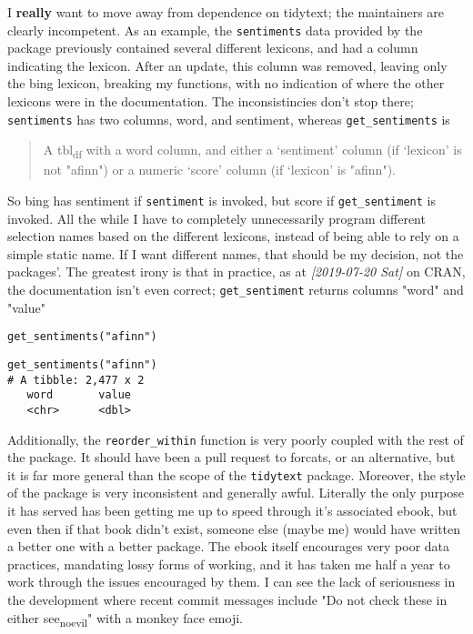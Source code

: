 \documentclass[a4paper, 11pt]{article}
\begin{document}
I \textbf{really} want to move away from dependence on tidytext; the
maintainers are clearly incompetent. As an example, the \texttt{sentiments}
data provided by the package previously contained several different
lexicons, and had a column indicating the lexicon. After an update,
this column was removed, leaving only the bing lexicon, breaking my
functions, with no indication of where the other lexicons were in the
documentation. The inconsistincies don't stop there; \texttt{sentiments} has
two columns, word, and sentiment, whereas \texttt{get\_sentiments} is
\begin{quote}
A tbl\textsubscript{df} with a word column, and either a ‘sentiment’ column (if
‘lexicon’ is not "afinn") or a numeric ‘score’ column (if
‘lexicon’ is "afinn").
\end{quote}
So bing has sentiment if \texttt{sentiment} is invoked, but score if
\texttt{get\_sentiment} is invoked. All the while I have to completely
unnecessarily program different selection names based on the different
lexicons, instead of being able to rely on a simple static name. If I
want different names, that should be my decision, not the packages'.
The greatest irony is that in practice, as at \textit{[2019-07-20 Sat] } on
CRAN, the documentation isn't even correct; \texttt{get\_sentiment} returns
columns "word" and "value"

\begin{verbatim}
get_sentiments("afinn")
\end{verbatim}

\begin{verbatim}
get_sentiments("afinn")
# A tibble: 2,477 x 2
   word       value
   <chr>      <dbl>
\end{verbatim}


 Additionally, the \texttt{reorder\_within} function is very
poorly coupled with the rest of the package. It should have been a
pull request to forcats, or an alternative, but it is far more general
than the scope of the \texttt{tidytext} package. Moreover, the style of the
package is very inconsistent and generally awful. Literally the only
purpose it has served has been getting me up to speed through it's
associated ebook, but even then if that book didn't exist, someone
else (maybe me) would have written a better one with a better package.
The ebook itself encourages very poor data practices, mandating lossy
forms of working, and it has taken me half a year to work through the
issues encouraged by them. I can see the lack of seriousness in the
development where recent commit messages include "Do not check these
in either see\textsubscript{no}\textsubscript{evil}" with a monkey face emoji. 
\end{document}
